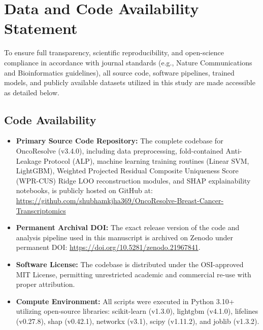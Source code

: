 \documentclass[10pt,a4paper,twocolumn]{article}
\begin{document}
\clearpage
\section{Data and Code Availability Statement}

To ensure full transparency, scientific reproducibility, and open-science compliance in accordance with journal standards (e.g., Nature Communications and Bioinformatics guidelines), all source code, software pipelines, trained models, and publicly available datasets utilized in this study are made accessible as detailed below.

\subsection{Code Availability}
\begin{itemize}
    \item \textbf{Primary Source Code Repository:} The complete codebase for OncoResolve (v3.4.0), including data preprocessing, fold-contained Anti-Leakage Protocol (ALP), machine learning training routines (Linear SVM, LightGBM), Weighted Projected Residual Composite Uniqueness Score (WPR-CUS) Ridge LOO reconstruction modules, and SHAP explainability notebooks, is publicly hosted on GitHub at: \url{https://github.com/shubhamkjha369/OncoResolve-Breast-Cancer-Transcriptomics}
    \item \textbf{Permanent Archival DOI:} The exact release version of the code and analysis pipeline used in this manuscript is archived on Zenodo under permanent DOI: \url{https://doi.org/10.5281/zenodo.21967841}.
    \item \textbf{Software License:} The codebase is distributed under the OSI-approved MIT License, permitting unrestricted academic and commercial re-use with proper attribution.
    \item \textbf{Compute Environment:} All scripts were executed in Python 3.10+ utilizing open-source libraries: scikit-learn (v1.3.0), lightgbm (v4.1.0), lifelines (v0.27.8), shap (v0.42.1), networkx (v3.1), scipy (v1.11.2), and joblib (v1.3.2).
\end{itemize}
\end{document}
